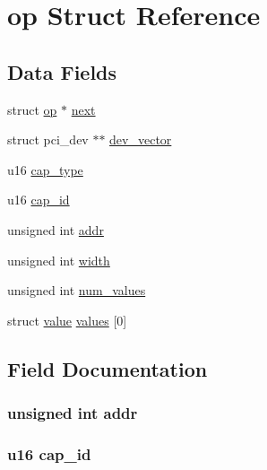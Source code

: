 \hypertarget{structop}{}\section{op Struct Reference}
\label{structop}
\subsection*{Data Fields}
\begin{DoxyCompactItemize}
\item 
struct \hyperlink{structop}{op} $\ast$ \hyperlink{structop_ab93123386f3ebc4e849a494eeee12f91}{next}
\item 
struct pci\+\_\+dev $\ast$$\ast$ \hyperlink{structop_abece9153f1b9b01d3eb0c6e613a8a1b0}{dev\+\_\+vector}
\item 
u16 \hyperlink{structop_a15f058d6a6b4f135b5b7e56c07aea31f}{cap\+\_\+type}
\item 
u16 \hyperlink{structop_a714643d5d10a3cc68e74cd11355672d2}{cap\+\_\+id}
\item 
unsigned int \hyperlink{structop_ab36863a07751ac73459d46b677c33b57}{addr}
\item 
unsigned int \hyperlink{structop_aca34d28e3d8bcbcadb8edb4e3af24f8c}{width}
\item 
unsigned int \hyperlink{structop_ab3c94e60c5982daa125da36e6e3a502c}{num\+\_\+values}
\item 
struct \hyperlink{structvalue}{value} \hyperlink{structop_a146633fb49f86d9bfb291becdea849a4}{values} \mbox{[}0\mbox{]}
\end{DoxyCompactItemize}


\subsection{Field Documentation}
\subsubsection[{\texorpdfstring{addr}{addr}}]{\setlength{\rightskip}{0pt plus 5cm}unsigned int addr}\hypertarget{structop_ab36863a07751ac73459d46b677c33b57}{}\label{structop_ab36863a07751ac73459d46b677c33b57}
\subsubsection[{\texorpdfstring{cap\+\_\+id}{cap_id}}]{\setlength{\rightskip}{0pt plus 5cm}u16 cap\+\_\+id}\hypertarget{structop_a714643d5d10a3cc68e74cd11355672d2}{}\label{structop_a714643d5d10a3cc68e74cd11355672d2}
